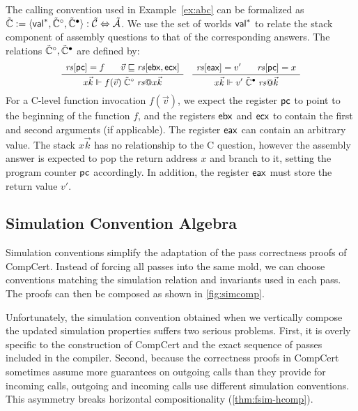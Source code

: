 \documentclass[sigplan,screen]{acmart}
\newcommand{\figsize}{\small}
\begin{document}
\begin{example} %
The calling convention used in Example~\ref{ex:abc}
can be formalized as %
$\tilde{\mathbb{C}} :=
  \langle  \mathsf{val} ^*, \tilde{\mathbb{C}}^\circ, \tilde{\mathbb{C}}^\bullet \rangle :
    \tilde{\mathcal{C}} \Leftrightarrow \tilde{\mathcal{A}}$.
We use the set of worlds $ \mathsf{val} ^*$
to relate the stack component of
assembly questions to that of the corresponding answers.
The relations $\tilde{\mathbb{C}}^\circ, \tilde{\mathbb{C}}^\bullet$
are defined by:
\[
  \figsize
  \AxiomC{$\mathit{rs}[\kw{pc}] = f$}
  \AxiomC{\hspace{-1em} $\vec{v} \sqsubseteq \mathit{rs}[\kw{ebx}, \kw{ecx}]$}
  \BinaryInfC{$
    x \vec{k} \Vdash
    f(\vec{v}) \mathrel{\tilde{\mathbb{C}}^\que} \mathit{rs}@ x \vec{k}
  $}
  \DisplayProof
  \quad
  \AxiomC{$\mathit{rs}[\kw{eax}] = v'$}
  \AxiomC{\hspace{-1em} $\mathit{rs}[\kw{pc}] = x$}
  \BinaryInfC{$
    x \vec{k} \Vdash
    v' \mathrel{\tilde{\mathbb{C}}^\ans} \mathit{rs}@\vec{k}
  $}
  \DisplayProof
\]
For a C-level function invocation $f(\vec{v})$,
we expect the register $ \mathsf{pc} $ to point to
the beginning of the function $f$,
and the registers $ \mathsf{ebx} $ and $ \mathsf{ecx} $
to contain the first and second arguments (if applicable).
The register $ \mathsf{eax} $ can contain an arbitrary value.
The stack $x \vec{k}$ has no relationship to the C question,
however the assembly answer is expected to pop the return address $x$
and branch to it, setting the program counter $ \mathsf{pc} $ accordingly.
In addition,
the register $ \mathsf{eax} $
must store
the return value $v'$.
\end{example}


\subsection{Simulation Convention Algebra} \label{sec:mainideas:simalg} %

Simulation conventions
simplify the adaptation of the pass correctness proofs of CompCert.
Instead of forcing all passes into the same mold,
we can choose conventions matching
the simulation relation and invariants
used in each pass.
The proofs can then be composed
as shown in \autoref{fig:simcomp}.

Unfortunately,
the simulation convention obtained
when we vertically compose the updated simulation properties
suffers two serious problems.
First,
it is overly specific to the construction of CompCert
and the exact sequence of passes included in the compiler.
Second,
because the correctness proofs in CompCert
sometimes assume more guarantees on outgoing calls
than they provide for incoming calls,
outgoing and incoming calls use different simulation conventions.
This asymmetry breaks %
horizontal compositionality (\autoref{thm:fsim-hcomp}).
\end{document}
